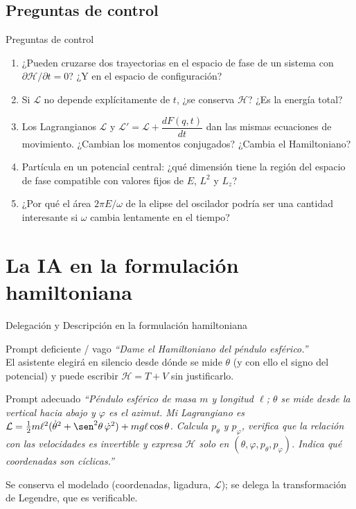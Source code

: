 \documentclass[spanish]{beamer}
\newcommand{\Lag}{\mathcal{L}}               %
\newcommand{\Ham}{\mathcal{H}}               %
\begin{document}
\subsection{Preguntas de control}
\begin{frame}{Preguntas de control}
\begin{enumerate}[<+->]
  \item ¿Pueden cruzarse dos trayectorias en el espacio de fase de un sistema con
        $\partial\Ham/\partial t=0$? ¿Y en el espacio de configuración?
  \item Si $\Lag$ no depende explícitamente de $t$, ¿se conserva $\Ham$? ¿Es la energía total?
  \item Los Lagrangianos $\Lag$ y $\Lag'=\Lag+\dfrac{dF(q,t)}{dt}$ dan las mismas ecuaciones
        de movimiento. ¿Cambian los momentos conjugados? ¿Cambia el Hamiltoniano?
  \item Partícula en un potencial central: ¿qué dimensión tiene la región del espacio de
        fase compatible con valores fijos de $E$, $L^2$ y $L_z$?
  \item ¿Por qué el área $2\pi E/\omega$ de la elipse del oscilador podría ser una cantidad
        interesante si $\omega$ cambia lentamente en el tiempo?
\end{enumerate}
\end{frame}

\section{La IA en la formulación hamiltoniana}

\begin{frame}{\alert{Delegación} y \alert{Descripción} en la formulación hamiltoniana}
\begin{alertblock}{Prompt deficiente / vago}
\textit{“Dame el Hamiltoniano del péndulo esférico.”}\\
El asistente elegirá en silencio desde dónde se mide $\theta$ (y con ello el signo del
potencial) y puede escribir $\Ham=T+V$ sin justificarlo.
\end{alertblock}
\pause
\begin{exampleblock}{Prompt adecuado}
\textit{“Péndulo esférico de masa $m$ y longitud $\ell$; $\theta$ se mide desde la vertical
hacia abajo y $\varphi$ es el azimut. Mi Lagrangiano es
$\Lag=\tfrac12 m\ell^2(\dot\theta^2+\sen^2\theta\,\dot\varphi^2)+mg\ell\cos\theta$.
Calcula $p_\theta$ y $p_\varphi$, verifica que la relación con las velocidades es
invertible y expresa $\Ham$ solo en $(\theta,\varphi,p_\theta,p_\varphi)$.
Indica qué coordenadas son cíclicas.”}
\end{exampleblock}
\pause
Se conserva el modelado (coordenadas, ligadura, $\Lag$); se delega la transformación
de Legendre, que es verificable.
\end{frame}
\end{document}
